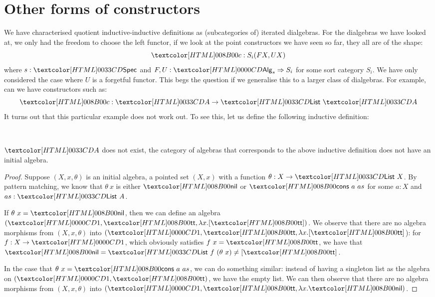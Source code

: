 \section{Other forms of constructors}
\label{other-forms-of-constructors}

We have characterised quotient inductive-inductive definitions as
(subcategories of) iterated dialgebras. For the dialgebras we have
looked at, we only had the freedom to choose the left functor, \ie if
we look at the point constructors we have seen so far, they all are of
the shape:
$$
\Ac : S_i(F X , U X)
$$
where $s : \specty$ and $F, U : \Func{\Alg_s}{S_i}$ for some sort
category $S_i$. We have only considered the case where $U$ is a
forgetful functor. This begs the question if we generalise this to a
larger class of dialgebras. For example, can we have constructors such
as:
$$
\Ac : \Aty \to \List\ \Aty
$$
It turns out that this particular example does not work out. To see
this, let us define the following inductive definition:
\begin{datatype}{\Aty}{\Set}
  \constr{\Aco}{\Aty} \\
  \constr{\Aci}{\Aty \to \List\ \Aty}
\end{datatype}

\begin{proposition}
  $\Aty$ does not exist, \ie the category of algebras that corresponds
  to the above inductive definition does not have an initial algebra.
\end{proposition}

\begin{proof}
  Suppose $(X,x,\theta)$ is an initial algebra, \ie a pointed set
  $(X,x)$ with a function $\theta : X \to \List\ X$. By pattern
  matching, we know that $\theta\ x$ is either $\listnil$ or
  $\listcons\ a\ as$ for some $a : X$ and $as : \List\ A$.

  If $\theta\ x = \listnil$, then we can define an algebra
  $(\unitty, \unitval, \lambda x . [ \unitval ])$. We observe that there are no
  algebra morphisms from $(X,x,\theta)$ into
  $(\unitty, \unitval, \lambda x . [ \unitval ]$): for $f : X \to \unitty$, which
  obviously satisfies $f\ x = \unitval$, we have that
  $\listnil = \List\ f\ (\theta\ x) \neq [ \unitval ]$.

  In the case that $\theta\ x = \listcons\ a\ as$, we can do something
  similar: instead of having a singleton list as the algebra on
  $(\unitty, \unitval)$, we have the empty list. We can then observe
  that there are no algebra morphisms from $(X,x,\theta)$ into
  $(\unitty, \unitval, \lambda x . \listnil)$.
\end{proof}

